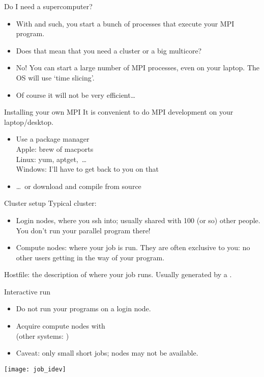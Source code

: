 \begin{numberedframe}{Do I need a supercomputer?}
  \begin{itemize}
  \item With  and such, you start a bunch of processes that
    execute your MPI program.
  \item Does that mean that you need a cluster or a big multicore?
  \item No! You can start a large number of MPI processes, even on
    your laptop. The OS will use `time slicing'.
  \item Of course it will not be very efficient\ldots
  \end{itemize}
\end{numberedframe}

\begin{numberedframe}{Installing your own MPI}
  It is convenient to do MPI development on your laptop/desktop.
  \begin{itemize}
  \item Use a package manager\\
    Apple: brew of macports\\
    Linux: yum, aptget,~\ldots\\
    Windows: I'll have to get back to you on that
  \item \ldots~or download and compile from source 
  \end{itemize}
\end{numberedframe}

\begin{numberedframe}{Cluster setup}
  \small
  Typical cluster:
  \begin{itemize}
  \item Login nodes, where you ssh into; usually shared with 100 (or
    so) other people. You don't run your parallel program there!
  \item Compute nodes: where your job is run. They are often exclusive
    to you: no other users getting in the way of your program.
  \end{itemize}
  Hostfile: the description of where your job runs. Usually generated
  by a .
\end{numberedframe}

\begin{numberedframe}{Interactive run}
  \begin{itemize}
  \item Do not run your programs on a login node.
  \item Acquire compute nodes with  \\
    (other systems: )
  \item Caveat: only small short jobs; nodes may not be available.
  \end{itemize}
  \texttt{[image: job\_idev]}
\end{numberedframe}

